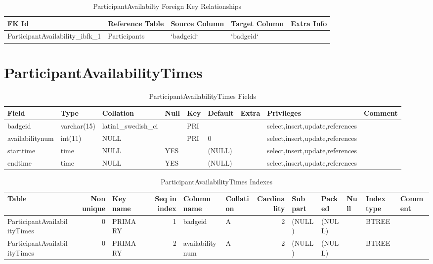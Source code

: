 \documentclass[captions=tablesignature]{scrartcl}
\begin{document}
\begin{table}[htb]
\caption{\label{tbl:participantavailabilityfkr}ParticipantAvailabilty Foreign Key Relationships}
\centering
\begin{tabular}{lllll}
\hline
FK Id & Reference Table & Source Column & Target Column & Extra Info\\
\hline
ParticipantAvailability\_ibfk\_1 & Participants & `badgeid` & `badgeid` & \\
\hline
\end{tabular}
\end{table}
\section{ParticipantAvailabilityTimes}
\label{sec-6}

\begin{table}[htb]
\caption{\label{tbl:participantavailabilitytimesfields}ParticipantAvailabilityTimes Fields}
\centering
\begin{tabular}{lllllllll}
\hline
Field & Type & Collation & Null & Key & Default & Extra & Privileges & Comment\\
\hline
badgeid & varchar(15) & latin1\_swedish\_ci &  & PRI &  &  & select,insert,update,references & \\
availabilitynum & int(11) & NULL &  & PRI & 0 &  & select,insert,update,references & \\
starttime & time & NULL & YES &  & (NULL) &  & select,insert,update,references & \\
endtime & time & NULL & YES &  & (NULL) &  & select,insert,update,references & \\
\hline
\end{tabular}
\end{table}

\begin{table}[htb]
\caption{\label{tbl:participantavailabilitytimesindexes}ParticipantAvailabilityTimes Indexes}
\centering
\begin{tabular}{lrlrllrlllll}
\hline
Table & Non unique & Key name & Seq in index & Column name & Collation & Cardinality & Sub part & Packed & Null & Index type & Comment\\
\hline
ParticipantAvailabilityTimes & 0 & PRIMARY & 1 & badgeid & A & 2 & (NULL) & (NULL) &  & BTREE & \\
ParticipantAvailabilityTimes & 0 & PRIMARY & 2 & availabilitynum & A & 2 & (NULL) & (NULL) &  & BTREE & \\
\hline
\end{tabular}
\end{table}
\end{document}
